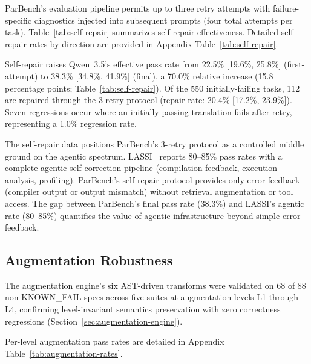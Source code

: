 \documentclass{article}
\begin{document}
ParBench's evaluation pipeline permits up to three retry attempts with failure-specific diagnostics injected into subsequent prompts (four total attempts per task). Table~\ref{tab:self-repair} summarizes self-repair effectiveness.
Detailed self-repair rates by direction are provided in Appendix Table~\ref{tab:self-repair}.


Self-repair raises Qwen~3.5's effective pass rate from 22.5\% [19.6\%, 25.8\%] (first-attempt) to 38.3\% [34.8\%, 41.9\%] (final), a 70.0\% relative increase (15.8 percentage points; Table~\ref{tab:self-repair}). Of the 550 initially-failing tasks, 112 are repaired through the 3-retry protocol (repair rate: 20.4\% [17.2\%, 23.9\%]). Seven regressions occur where an initially passing translation fails after retry, representing a 1.0\% regression rate.

The self-repair data positions ParBench's 3-retry protocol as a controlled middle ground on the agentic spectrum. LASSI~\cite{LASSI2024} reports 80--85\% pass rates with a complete agentic self-correction pipeline (compilation feedback, execution analysis, profiling). ParBench's self-repair protocol provides only error feedback (compiler output or output mismatch) without retrieval augmentation or tool access. The gap between ParBench's final pass rate (38.3\%) and LASSI's agentic rate (80--85\%) quantifies the value of agentic infrastructure beyond simple error feedback.

\subsection{Augmentation Robustness}
\label{sec:augmentation-robustness}

The augmentation engine's six AST-driven transforms were validated on 68 of 88 non-KNOWN\_FAIL specs across five suites at augmentation levels L1 through L4, confirming level-invariant semantics preservation with zero correctness regressions (Section~\ref{sec:augmentation-engine}).

Per-level augmentation pass rates are detailed in Appendix Table~\ref{tab:augmentation-rates}.
\end{document}
